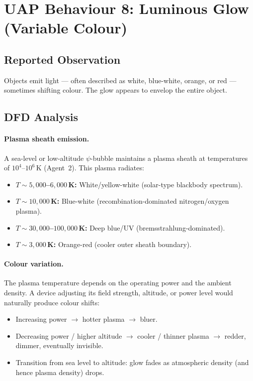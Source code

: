 \documentclass[12pt,a4paper]{article}
\begin{document}
\section{UAP Behaviour 8: Luminous Glow (Variable Colour)}\label{sec:glow}

\subsection{Reported Observation}

Objects emit light --- often described as white, blue-white, orange,
or red --- sometimes shifting colour.  The glow appears to envelop the
entire object.

\subsection{DFD Analysis}

\paragraph{Plasma sheath emission.}
A sea-level or low-altitude $\psi$-bubble maintains a plasma sheath at
temperatures of $10^4$--$10^6$\,K (Agent~2).  This plasma radiates:

\begin{itemize}
\item \textbf{$T \sim 5{,}000$--$6{,}000$\,K:} White/yellow-white
  (solar-type blackbody spectrum).
\item \textbf{$T \sim 10{,}000$\,K:} Blue-white
  (recombination-dominated nitrogen/oxygen plasma).
\item \textbf{$T \sim 30{,}000$--$100{,}000$\,K:} Deep blue/UV
  (bremsstrahlung-dominated).
\item \textbf{$T \sim 3{,}000$\,K:} Orange-red
  (cooler outer sheath boundary).
\end{itemize}

\paragraph{Colour variation.}
The plasma temperature depends on the operating power and the
ambient density.  A device adjusting its field strength, altitude, or
power level would naturally produce colour shifts:
\begin{itemize}
\item Increasing power $\rightarrow$ hotter plasma $\rightarrow$ bluer.
\item Decreasing power / higher altitude $\rightarrow$ cooler / thinner
  plasma $\rightarrow$ redder, dimmer, eventually invisible.
\item Transition from sea level to altitude: glow fades as
  atmospheric density (and hence plasma density) drops.
\end{itemize}
\end{document}
